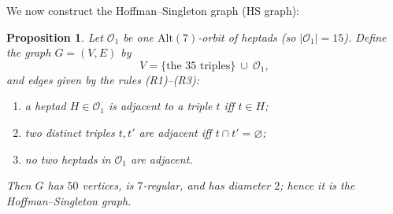 \documentclass[12pt,a4paper,openany]{book}
\newtheorem{proposition}{Proposition}[section]
\begin{document}
We now construct the Hoffman--Singleton graph (HS graph):
\begin{proposition}
Let $\mathcal O_1$ be one $\mathrm{Alt}(7)$-orbit of heptads (so $|\mathcal O_1|=15$).
Define the graph $G=(V,E)$ by
\[
V=\{\text{the }35\text{ triples}\}\ \cup\ \mathcal O_1,
\]
and edges given by the rules (R1)--(R3):
\begin{enumerate}[label=(R\arabic*)]
  \item a heptad $H\in\mathcal O_1$ is adjacent to a triple $t$ iff $t\in H$;
  \item two distinct triples $t,t'$ are adjacent iff $t\cap t'=\varnothing$;
  \item no two heptads in $\mathcal O_1$ are adjacent.
\end{enumerate}
Then $G$ has $50$ vertices, is $7$-regular, and has diameter $2$; hence it is the Hoffman--Singleton graph.
\end{proposition}
\end{document}

